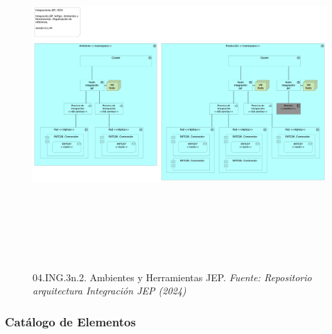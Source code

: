 \documentclass[
  paper=a4,
  ,captions=tableheading
]{scrartcl}
\begin{document}
\begin{figure}
\centering
\includegraphics[width=\textwidth,height=5.20833in]{images/04.ING.3n.2.AmbientesyHerramientasJEP.png}
\caption{04.ING.3n.2. Ambientes y Herramientas JEP. \emph{Fuente:
Repositorio arquitectura Integración JEP
(2024)}}\label{fig:id-53af0cb1d4e145a6b82764f7ce8f9237}
\end{figure}

\subsubsection{Catálogo de
Elementos}\label{sec:catuxe1logo-de-elementos-4}
\end{document}
